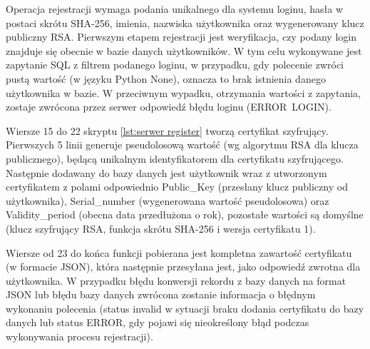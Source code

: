 	Operacja rejestracji wymaga podania unikalnego dla systemu loginu, hasła w postaci skrótu SHA-256, imienia, nazwiska użytkownika oraz wygenerowany klucz publiczny RSA. Pierwszym etapem rejestracji jest weryfikacja, czy podany login znajduje się obecnie w bazie danych użytkowników. W tym celu wykonywane jest zapytanie SQL z filtrem podanego loginu, w przypadku, gdy polecenie zwróci pustą wartość (w języku Python None), oznacza to brak istnienia danego użytkownika w bazie. W przeciwnym wypadku, otrzymania wartości z zapytania, zostaje zwrócona przez serwer odpowiedź błędu loginu (ERROR~LOGIN).
	
	Wiersze 15 do 22 skryptu \ref{lst:serwer register} tworzą certyfikat szyfrujący. Pierwszych 5 \linebreak linii generuje pseudolosową wartość (wg algorytmu RSA dla klucza publicznego), będącą unikalnym identyfikatorem dla certyfikatu szyfrującego. Następnie dodawany do bazy danych jest użytkownik wraz z utworzonym certyfikatem z polami odpowiednio Public\_Key (przesłany klucz publiczny od użytkownika), \linebreak Serial\_number (wygenerowana wartość pseudolosowa) oraz Validity\_period \linebreak (obecna data przedłużona o rok), pozostałe wartości są domyślne (klucz szyfrujący RSA, funkcja skrótu SHA-256 i wersja certyfikatu 1).
	
	Wiersze od 23 do końca funkcji pobierana jest kompletna zawartość certyfikatu (w formacie JSON), która następnie przesyłana jest, jako odpowiedź zwrotna dla użytkownika. W przypadku błędu konwersji rekordu z bazy danych na format JSON lub błędu bazy danych zwrócona zostanie informacja o błędnym wykonaniu polecenia (status invalid w sytuacji braku dodania certyfikatu do bazy danych lub status ERROR, gdy pojawi się nieokreślony błąd podczas wykonywania procesu rejestracji).
	
